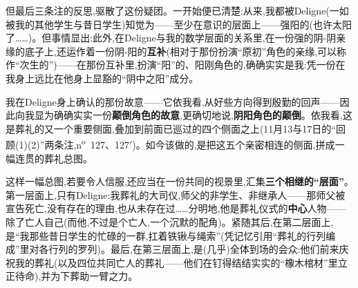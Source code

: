 但最后三条注的反思,驱散了这份疑团。一开始便已清楚:从来,我都被Deligne(一如被我的其他学生与昔日学生)知觉为——至少在意识的层面上——强阳的(也许太阳了……)。但事情显出:此外,在Deligne与我的数学层面的关系里,在一份强的阴-阴亲缘的底子上,还运作着一份阴-阳的\textbf{互补}(相对于那份扮演“原初”角色的亲缘,可以称作“次生的”)——在那份互补里,扮演“阳”的、阳刚角色的,确确实实是我:凭一份在我身上远比在他身上显豁的“阴中之阳”成分。

我在Deligne身上确认的那份故意——它依我看,从好些方向得到殷勤的回声——因此向我显为确确实实一份\textbf{颠倒角色的故意}\dmark{},更确切地说,\textbf{阴阳角色的颠倒}。依我看,这是葬礼的又一个重要侧面,叠加到前面已巡过的四个侧面之上(11月13与17日的“回顾(1)(2)”两条注,n\textsuperscript{o}~127、127$'$)。如今该做的,是把这五个亲密相连的侧面,拼成一幅连贯的葬礼总图。

这样一幅总图,若要令人信服,还应当在一份共同的视景里,汇集\textbf{三个相继的“层面”}。第一层面上,只有Deligne:我葬礼的大司仪,师父的非学生、非继承人——那师父被宣告死亡,没有存在的理由,也从未存在过……分明地,他是葬礼仪式的\textbf{中心}人物——除了亡人自己(而他,不过是个亡人,一个沉默的配角)。紧随其后,在第二层面上,是“我那些昔日学生的忙碌的一群,扛着铁锹与绳索”(凭记忆引用“葬礼的行列编成”里对各行列的罗列)。最后,在第三层面上,是(几乎)全体到场的会众:他们前来庆祝我的葬礼(以及四位共同亡人的葬礼——他们在钉得结结实实的“橡木棺材”里立正待命),并为下葬助一臂之力。

